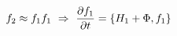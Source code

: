 \documentclass[preview]{standalone}
\begin{document}
\begin{align*}
\special{dvisvgm:raw <g id='unique000'>}f_2\approx f_1 f_1\ \Rightarrow\ \pdv{f_1}{t}=\pb{H_1+\Phi}{f_1}\special{dvisvgm:raw </g>}
\end{align*}
\end{document}
